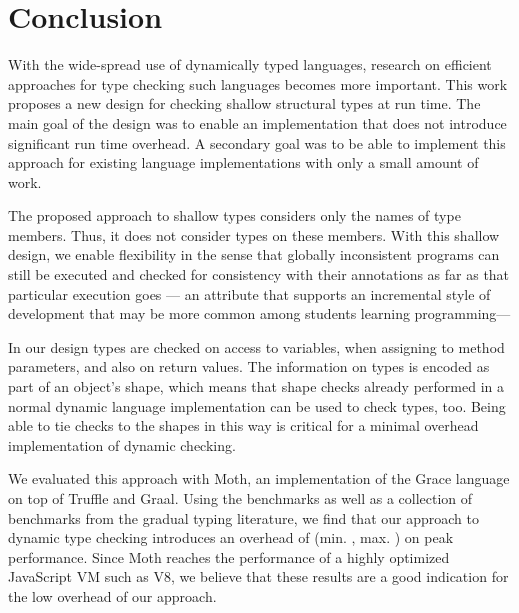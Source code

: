 
\section{Conclusion}
\label{sec:conclusion}

With the wide-spread use of dynamically typed languages,
research on efficient approaches for type checking
such languages becomes more important.
%
This work proposes a new design for checking shallow structural
types at run time.
The main goal of the design was to enable an implementation that
does not introduce significant run time overhead.
A secondary goal was to be able to implement this approach for
existing language implementations with only a small amount of work.


The proposed approach to shallow types considers only the names of type members.
Thus, it does not consider types on these members.
With this shallow design, we enable flexibility in the sense that
globally inconsistent programs can still be executed and
checked for consistency with their annotations as far as
that particular execution goes%
--- an attribute that supports an incremental style of development
that may be more common among students learning programming---%

In our design types are checked on access to variables,
when assigning to method parameters, and also on return values.
The information on types is encoded as part of an object's shape,
which means that shape checks already performed in a normal dynamic
language implementation can be used to check types, too. 
Being able to tie checks to the shapes in this way is critical for 
a minimal overhead implementation of dynamic checking.

We evaluated this approach with Moth, an implementation of the Grace language
on top of Truffle and Graal.
Using the \AWFY benchmarks as well as a collection of benchmarks from the
gradual typing literature, we find that our approach to dynamic type checking
introduces an overhead of 
\OverheadTypingGMeanP (min. \OverheadTypingMinP, max. \OverheadTypingMaxP)
on peak performance.
Since Moth reaches the performance of a
highly optimized JavaScript VM such as V8,
we believe that these results are a good indication
for the low overhead of our approach.

